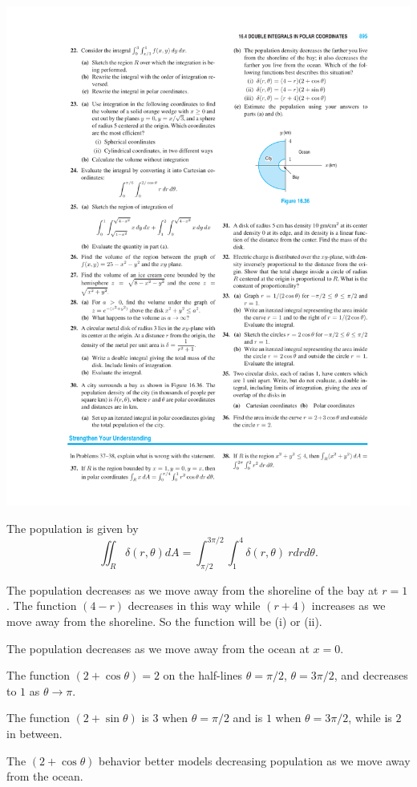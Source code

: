 \documentclass[12pt,letterpaper,noanswers]{exam}
\begin{document}
\begin{questions}
 \includegraphics{img/HW07p2.pdf}
 
 \begin{solution}

 The population is given by \[\iint_R \delta(r,\theta) dA = \int_{\pi/2}^{3\pi/2}\int_1^4\delta(r,\theta)\ rdrd\theta.\]

The population decreases as we move away from the shoreline of the bay at $r=1$.  The function $(4-r)$ decreases in this way while $(r+4)$ increases as we move away from the shoreline.  So the function will be (i) or (ii). 

The population decreases as we move away from the ocean at $x = 0$.  

The function $(2+\cos\theta) = 2$ on the half-lines $\theta=\pi/2$, $\theta = 3\pi/2$, and decreases to $1$ as $\theta\rightarrow\pi$.  

The function $(2+\sin\theta)$ is $3$ when $\theta=\pi/2$ and is $1$ when $\theta = 3\pi/2$, while is $2$ in between.  

The $(2+\cos\theta)$ behavior better models decreasing population as we move away from the ocean.  


\end{solution}
\end{questions}
\end{document}
